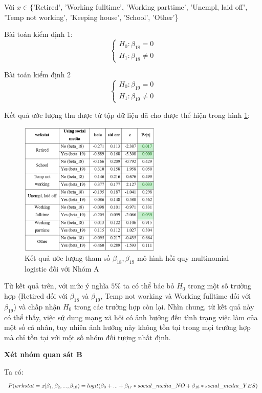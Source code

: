 Với $x \in\{$'Retired', 'Working fulltime', 'Working parttime', 'Unempl, laid off', 'Temp not working', 'Keeping house', 'School', 'Other'\}

Bài toán kiểm định 1:
$$
\left\{\begin{array}{l}
H_{0}: \beta_{18}=0 \\
H_{1}: \beta_{18} \neq 0
\end{array}\right.
$$

Bài toán kiểm định 2
$$
\left\{\begin{array}{l}
H_{0}: \beta_{19}=0 \\
H_{1}: \beta_{19} \neq 0
\end{array}\right.
$$

Kết quả ước lượng thu được từ tập dữ liệu đã cho được thể hiện trong hình \ref{fig:beta1819}:

\begin{figure}[h!]
    \centering
    \includegraphics[width=0.6\textwidth]{figures/beta1819.png}
    \caption{Kết quả ước lượng tham số $\beta_{18}, \beta_{19}$ mô hình hồi quy multinomial logistic đối với Nhóm A}
    \label{fig:beta1819}
\end{figure}

Từ kết quả trên, với mức ý nghĩa $5 \%$ ta có thể bác bỏ $H_{0}$ trong một số trường hợp (Retired đối với $\beta_{18}$ và $\beta_{19}$, Temp not working và Working fulltime đối với $\beta_{19}$) và chấp nhận $H_{0}$ trong các trường hợp còn lại. Nhìn chung, từ kết quả này có thể thấy, việc sử dụng mạng xã hội có ảnh hưởng đến tình trạng việc làm của một số cá nhân, tuy nhiên ảnh hưởng này không tồn tại trong mọi trường hợp mà chỉ tồn tại với một số nhóm đối tượng nhất định.


\textbf{Xét nhóm quan sát B}

Ta có:
$$
    P(wrkstat = x | \beta_1, \beta_2,..., \beta_{18}) = logit(\beta_0 + ... + \beta_{17} * social\_media\_NO \\
    + \beta_{18} * social\_media\_YES)
$$

